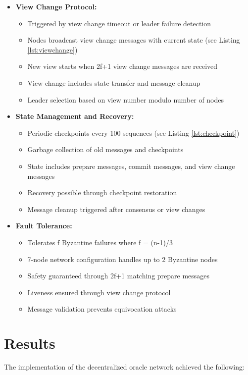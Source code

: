 \documentclass[12pt]{article}
\begin{document}
\begin{itemize}
    \item \textbf{View Change Protocol:}
    \begin{itemize}
        \item Triggered by view change timeout or leader failure detection
        \item Nodes broadcast view change messages with current state (see Listing \ref{lst:viewchange})
        \item New view starts when 2f+1 view change messages are received
        \item View change includes state transfer and message cleanup
        \item Leader selection based on view number modulo number of nodes
    \end{itemize}

    \item \textbf{State Management and Recovery:}
    \begin{itemize}
        \item Periodic checkpoints every 100 sequences (see Listing \ref{lst:checkpoint})
        \item Garbage collection of old messages and checkpoints
        \item State includes prepare messages, commit messages, and view change messages
        \item Recovery possible through checkpoint restoration
        \item Message cleanup triggered after consensus or view changes
    \end{itemize}

    \item \textbf{Fault Tolerance:}
    \begin{itemize}
        \item Tolerates f Byzantine failures where f = (n-1)/3
        \item 7-node network configuration handles up to 2 Byzantine nodes
        \item Safety guaranteed through 2f+1 matching prepare messages
        \item Liveness ensured through view change protocol
        \item Message validation prevents equivocation attacks
    \end{itemize}
\end{itemize}

\section{Results}
The implementation of the decentralized oracle network achieved the following:
\end{document}
